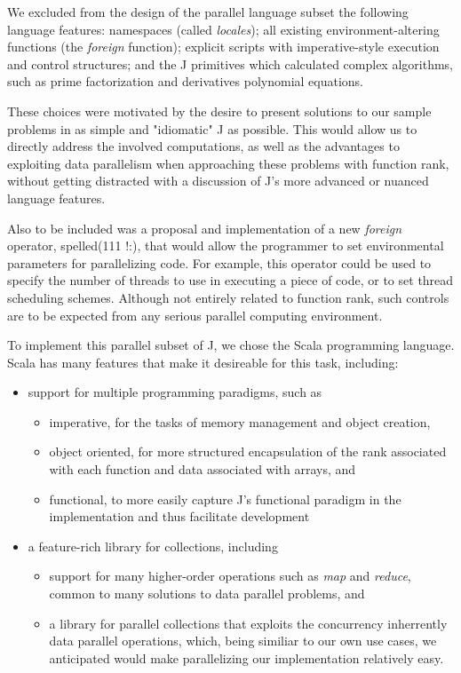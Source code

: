 We excluded from the design of the parallel language subset the following language features: 
namespaces (called \textit{locales});
all existing environment-altering functions (the \textit{foreign} function);
explicit scripts with imperative-style execution and control structures;
and the J primitives which calculated complex algorithms, such as prime factorization and derivatives polynomial equations.

These choices were motivated by the desire to present solutions to our sample problems in as simple and "idiomatic" J as possible.
This would allow us to directly address the involved computations, as well as the advantages to exploiting data parallelism when approaching these problems with function rank, 
without getting distracted with a discussion of J's more advanced or nuanced language features.

Also to be included was a proposal and implementation of a new \textit{foreign} operator, spelled\ttfamily (111 !:)\normalfont , 
that would allow the programmer to set environmental parameters for parallelizing code.
For example, this operator could be used to specify the number of threads to use in executing a piece of code, 
or to set thread scheduling schemes.
Although not entirely related to function rank, such controls are to be expected from any serious parallel computing environment.

To implement this parallel subset of J, we chose the Scala programming language. %
Scala has many features that make it desireable for this task, including: 
\begin{itemize}
	\item support for multiple programming paradigms, such as
	\begin{itemize}
		\item imperative, for the tasks of memory management and object creation,
		\item object oriented, for more structured encapsulation of the rank associated with each function 
			and data associated with arrays, and
		\item functional, to more easily capture J's functional paradigm in the implementation and thus facilitate development
	\end{itemize}
	\item a feature-rich library for collections, including
	\begin{itemize}
		\item support for many higher-order operations such as \textit{map} and \textit{reduce}, 
			common to many solutions to data parallel problems, and
		\item a library for parallel collections that exploits the concurrency inherrently data parallel operations,
			which, being similiar to our own use cases, we anticipated would make parallelizing our implementation relatively easy.
	\end{itemize}
\end{itemize}

